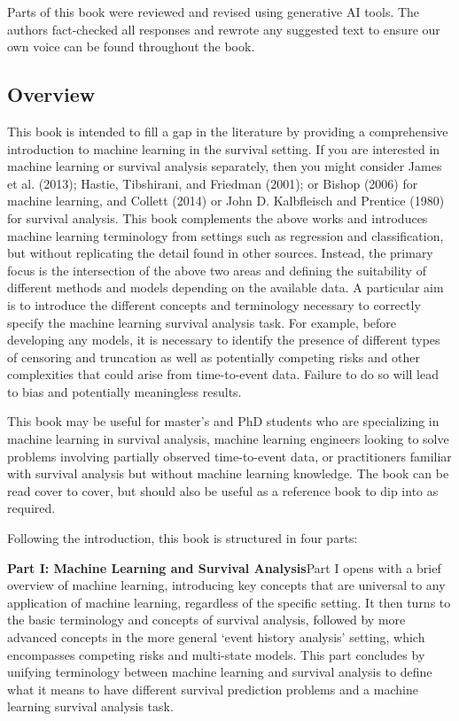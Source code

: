 \documentclass[
  letterpaper,
  krantz2]{style/krantz}
\begin{document}
Parts of this book were reviewed and revised using generative AI tools.
The authors fact-checked all responses and rewrote any suggested text to
ensure our own voice can be found throughout the book.

\subsection*{Overview}

This book is intended to fill a gap in the literature by providing a
comprehensive introduction to machine learning in the survival setting.
If you are interested in machine learning or survival analysis
separately, then you might consider James et al. (2013); Hastie,
Tibshirani, and Friedman (2001); or Bishop (2006) for machine learning,
and Collett (2014) or John D. Kalbfleisch and Prentice (1980) for
survival analysis. This book complements the above works and introduces
machine learning terminology from settings such as regression and
classification, but without replicating the detail found in other
sources. Instead, the primary focus is the intersection of the above two
areas and defining the suitability of different methods and models
depending on the available data. A particular aim is to introduce the
different concepts and terminology necessary to correctly specify the
machine learning survival analysis task. For example, before developing
any models, it is necessary to identify the presence of different types
of censoring and truncation as well as potentially competing risks and
other complexities that could arise from time-to-event data. Failure to
do so will lead to bias and potentially meaningless results.

This book may be useful for master's and PhD students who are
specializing in machine learning in survival analysis, machine learning
engineers looking to solve problems involving partially observed
time-to-event data, or practitioners familiar with survival analysis but
without machine learning knowledge. The book can be read cover to cover,
but should also be useful as a reference book to dip into as required.

Following the introduction, this book is structured in four parts:

\textbf{Part I: Machine Learning and Survival Analysis}\newline Part I
opens with a brief overview of machine learning, introducing key
concepts that are universal to any application of machine learning,
regardless of the specific setting. It then turns to the basic
terminology and concepts of survival analysis, followed by more advanced
concepts in the more general `event history analysis' setting, which
encompasses competing risks and multi-state models. This part concludes
by unifying terminology between machine learning and survival analysis
to define what it means to have different survival prediction problems
and a machine learning survival analysis task.
\end{document}
